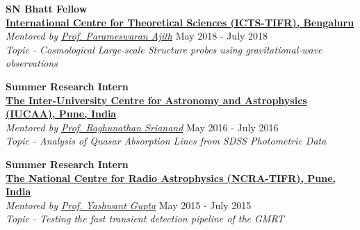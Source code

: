\documentclass[margin, centered]{res}
\begin{document}
\begin{resume}
\textbf{SN Bhatt Fellow}
\\
\textbf{\href{https://www.icts.res.in/}{International Centre for Theoretical Sciences (ICTS-TIFR), Bengaluru}}\\
\emph{Mentored by \href{https://home.icts.res.in/~ajith/Home.html}{Prof. Parameswaran Ajith}} \hfill May 2018 - July 2018\\
\textit{Topic - Cosmological Large-scale Structure probes using gravitational-wave observations}


\textbf{Summer Research Intern}
\\
\textbf{\href{http://www.iucaa.ernet.in/}{The Inter-University Centre for Astronomy and Astrophysics (IUCAA), Pune, India}}
\\
\emph{Mentored by \href{http://www.iucaa.ernet.in/~anand/}{Prof. Raghunathan Srianand}} \hfill May 2016 - July 2016\\
\textit{Topic - Analysis of Quasar Absorption Lines from SDSS Photometric Data}

\textbf{Summer Research Intern}\\
\textbf{\href{http://www.ncra.tifr.res.in/}{The National Centre for Radio Astrophysics (NCRA-TIFR), Pune, India}}\\
\emph{Mentored by \href{http://www.ncra.tifr.res.in/ncra/people/academic/ncra-faculty/Yashwant_Gupta}{Prof. Yashwant Gupta}} \hfill May 2015 - July 2015\\
\textit{Topic - Testing the fast transient detection pipeline of the GMRT}

\begin{comment}



\end{comment}
\end{resume}
\end{document}
